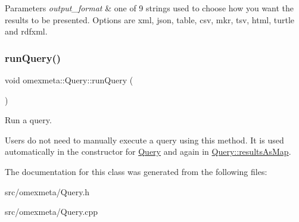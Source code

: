 \begin{DoxyParams}{Parameters}
{\em output\+\_\+format} & one of 9 strings used to choose how you want the results to be presented. Options are xml, json, table, csv, mkr, tsv, html, turtle and rdfxml. \\
\hline
\end{DoxyParams}
\mbox{\label{classomexmeta_1_1Query_a879a4db0413abc8f4a3470877ebf5193}} 
\subsubsection{\texorpdfstring{run\+Query()}{runQuery()}}
{\footnotesize\ttfamily void omexmeta\+::\+Query\+::run\+Query (\begin{DoxyParamCaption}{ }\end{DoxyParamCaption})}



Run a query. 

Users do not need to manually execute a query using this method. It is used automatically in the constructor for \hyperlink{classomexmeta_1_1Query}{Query} and again in \hyperlink{classomexmeta_1_1Query_ab50cc5f76dcf7f863f9fa9d0bf755071}{Query\+::results\+As\+Map}. 

The documentation for this class was generated from the following files\+:\begin{DoxyCompactItemize}
\item 
src/omexmeta/Query.\+h\item 
src/omexmeta/Query.\+cpp\end{DoxyCompactItemize}
